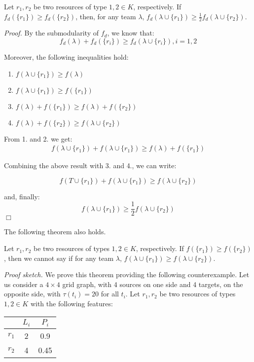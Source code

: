 \begin{theorem}\label{thm:on_half_lb}
Let $r_1, r_2$ be two resources of type $1,2 \in K$, respectively. If $f_d(\{r_1\}) \geq f_d(\{r_2\})$, then, for any team $\lambda$, $f_d(\lambda \cup \{r_1\}) \geq \frac{1}{2}f_d(\lambda \cup \{r_2\})$.
\end{theorem}

\noindent
\textit{Proof.} By the submodularity of $f_d$, we know that:
\begin{equation*}
f_d(\lambda) + f_d(\{r_i\}) \geq f_d(\lambda \cup \{r_i\}), i=1,2
\end{equation*}

Moreover, the following inequalities hold:
\begin{enumerate}
\item $f(\lambda \cup \{r_1\}) \geq f(\lambda)$
\item $f(\lambda \cup \{r_1\}) \geq f(\{r_1\})$
\item $f(\lambda) + f(\{r_1\}) \geq f(\lambda) + f(\{r_2\})$
\item $f(\lambda) + f(\{r_2\}) \geq f(\lambda \cup \{r_2\})$
\end{enumerate}

\noindent
From 1. and 2. we get:
\begin{align*}
f(\lambda \cup \{r_1\}) + f(\lambda \cup \{r_1\}) \geq f(\lambda) + f(\{r_1\})
\end{align*}

\noindent
Combining the above result with 3. and 4., we can write:

\begin{equation*}
f(T \cup \{r_1\}) + f(\lambda \cup \{r_1\}) \geq f(\lambda \cup \{r_2\})
\end{equation*}

\noindent
and, finally:
\begin{equation*}
f(\lambda \cup \{r_1\}) \geq \frac{1}{2}f(\lambda \cup \{r_2\})
\end{equation*}
\hfill $\Box$

The following theorem also holds.

\begin{theorem}\label{thm:no_bigger}
Let $r_1, r_2$ be two resources of types $1,2 \in K$, respectively. If $f(\{r_1\}) \geq f(\{r_2\})$, then we cannot say if for any team $\lambda$, $f(\lambda \cup \{r_1\}) \geq f(\lambda \cup \{r_2\})$.
\end{theorem}

\noindent
\textit{Proof sketch.} We prove this theorem providing the following counterexample. Let us consider a $4\times4$ grid graph, with 4 sources on one side and 4 targets, on the opposite side, with $\tau(t_i) = 20$ for all $t_i$. Let $r_1, r_2$ be two resources of types $1,2 \in K$ with the following features:
\begin{center}
\begin{tabular}{ | c | c | c |}
\hline
 & $L_i$ & $P_i$\\ \hline
$r_1$ & 2 & 0.9\\ \hline
$r_2$ & 4 & 0.45\\ \hline
\end{tabular}\label{table:example_features}
\end{center}

